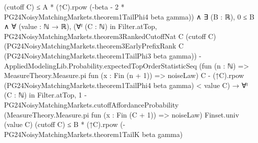 \documentclass[10pt]{article}
\begin{document}
\begin{ReviewVerbatim}
                          (cutoff C) ≤
                        A * (↑C).rpow (-beta - 2 * PG24NoisyMatchingMarkets.theorem1TailPhi4 beta gamma)) ∧
                ∃ (B : ℝ),
                  0 ≤ B ∧
                    ∀ (value : ℕ → ℝ),
                      (∀ᶠ (C : ℕ) in Filter.atTop,
                          PG24NoisyMatchingMarkets.theorem3RankedCutoffNat C (cutoff C)
                                  (PG24NoisyMatchingMarkets.theorem3EarlyPrefixRank C
                                    (PG24NoisyMatchingMarkets.theorem1TailPhi3 beta gamma)) -
                                AppliedModelingLib.Probability.expectedTopOrderStatisticSeq
                                  (fun (n : ℕ) => MeasureTheory.Measure.pi fun (x : Fin (n + 1)) => noiseLaw) C -
                              (↑C).rpow (PG24NoisyMatchingMarkets.theorem1TailPhi4 beta gamma) <
                            value C) →
                        ∀ᶠ (C : ℕ) in Filter.atTop,
                          1 -
                              PG24NoisyMatchingMarkets.cutoffAffordanceProbability
                                (MeasureTheory.Measure.pi fun (x : Fin (C + 1)) => noiseLaw) Finset.univ (value C)
                                (cutoff C) ≤
                            B * (↑C).rpow (-PG24NoisyMatchingMarkets.theorem1TailK beta gamma)
\end{ReviewVerbatim}
\end{document}
